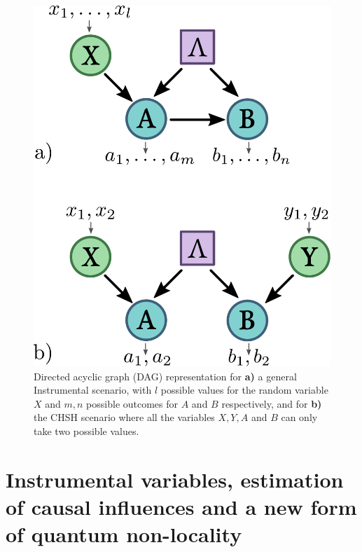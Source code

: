 \documentclass[letterpaper]{article}
\begin{document}
\begin{figure}[h]
    \centering
    \includegraphics[width=.8\columnwidth]{images/chsh_inst_dag.pdf}
        \caption{
    Directed acyclic graph (DAG) representation for
    \textbf{a)} a general
    Instrumental scenario, with $l$ possible values for the random variable $X$
    and $m,n$ possible outcomes for $A$ and $B$ respectively, and for
    \textbf{b)} the CHSH scenario where all the
    variables $X,Y,A$ and $B$ can only take two possible values.
}
    \label{fig:chshinstdag}

\end{figure} 

\section*{Instrumental variables, estimation of causal influences and a new form of quantum non-locality}
\end{document}
